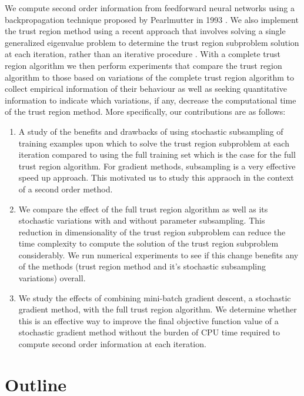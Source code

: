\documentclass[letterpaper,12pt,titlepage,oneside,final]{book}
\begin{document}
	We compute second order information from feedforward neural networks using a backpropagation technique proposed by Pearlmutter in 1993 \cite{Pearlmutter.1993}. We also implement the trust region method using a recent approach that involves solving a single generalized eigenvalue problem to determine the trust region subproblem solution at each iteration, rather than an iterative procedure \cite{adachi.paper}. With a complete trust region algorithm we then perform experiments that compare the trust region algorithm to those based on variations of the complete trust region algorithm to collect empirical information of their behaviour as well as seeking quantitative information to indicate which variations, if any, decrease the computational time of the trust region method. More specifically, our contributions are as follows:
	
	\begin{enumerate}
		\item{A study of the benefits and drawbacks of using stochastic subsampling of training examples upon which to solve the trust region subproblem at each iteration compared to using the full training set which is the case for the full trust region algorithm. For gradient methods, subsampling is a very effective speed up approach. This motivated us to study this appraoch in the context of a second order method.}
		\item{We compare the effect of the full trust region algorithm as well as its stochastic variations with and without parameter subsampling. This reduction in dimensionality of the trust region subproblem can reduce the time complexity to compute the solution of the trust region subproblem considerably. We run numerical experiments to see if this change benefits any of the methods (trust region method and it's stochastic subsampling variations) overall.}
		\item{We study the effects of combining mini-batch gradient descent, a stochastic gradient method, with the full trust region algorithm. We determine whether this is an effective way to improve the final objective function value of a stochastic gradient method without the burden of CPU time required to compute second order information at each iteration.}
	\end{enumerate}
	
	
	\section{Outline}
	
\end{document}
